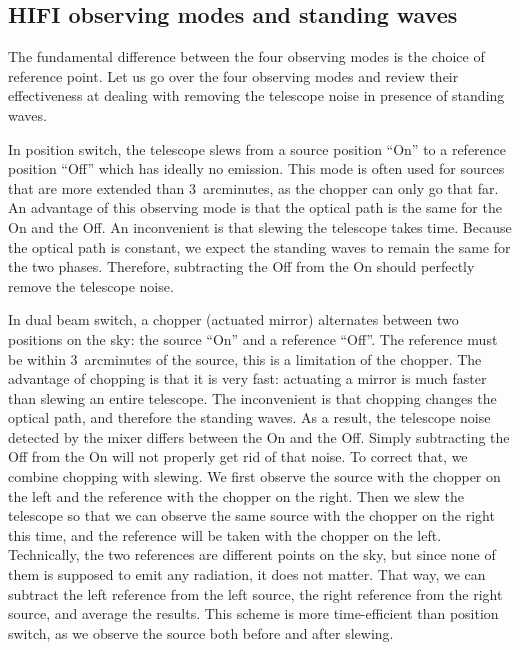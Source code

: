 \subsection{HIFI observing modes and standing waves}
The fundamental difference between the four observing modes is the choice of reference point. Let us go over the four observing modes and review their effectiveness at dealing with removing the telescope noise in presence of standing waves.

In position switch, the telescope slews from a source position ``On'' to a reference position ``Off'' which has ideally no emission.
This mode is often used for sources that are more extended than 3~arcminutes, as the chopper can only go that far.
An advantage of this observing mode is that the optical path is the same for the On and the Off.
An inconvenient is that slewing the telescope takes time.
Because the optical path is constant, we expect the standing waves to remain the same for the two phases.
Therefore, subtracting the Off from the On should perfectly remove the telescope noise.

\label{sec:dual_beam_switch}In dual beam switch, a chopper (actuated mirror) alternates between two positions on the sky: the source ``On'' and a reference ``Off''.
The reference must be within 3~arcminutes of the source, this is a limitation of the chopper.
The advantage of chopping is that it is very fast: actuating a mirror is much faster than slewing an entire telescope.
The inconvenient is that chopping changes the optical path, and therefore the standing waves.
As a result, the telescope noise detected by the mixer differs between the On and the Off.
Simply subtracting the Off from the On will not properly get rid of that noise.
To correct that, we combine chopping with slewing.
We first observe the source with the chopper on the left and the reference with the chopper on the right.
Then we slew the telescope so that we can observe the same source with the chopper on the right this time, and the reference will be taken with the chopper on the left.
Technically, the two references are different points on the sky, but since none of them is supposed to emit any radiation, it does not matter.
That way, we can subtract the left reference from the left source, the right reference from the right source, and average the results.
This scheme is more time-efficient than position switch, as we observe the source both before and after slewing.

